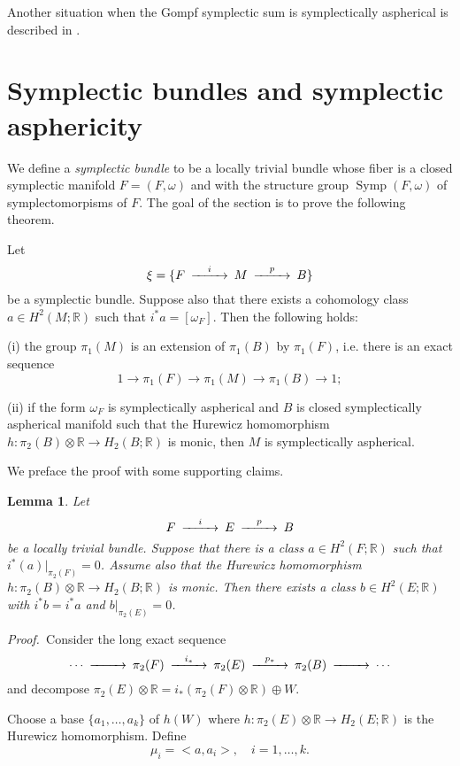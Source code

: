 \documentclass[12pt, twoside]{amsart}
\theoremstyle{plain}
\newtheorem{lemma}[theorem]{Lemma}
\theoremstyle{definition}
\numberwithin{equation}{section}
\def\RR{\mathbb R}
\def\sympl{\operatorname {Symp}}
\def\RR{\mathbb R}
\def\m{\medskip}
\def\p{{\it Proof.\ }}
\begin{document}
\m Another situation when the Gompf symplectic sum 
is symplectically aspherical is described in \cite[Proposition 3.1]{K}.

\section{Symplectic bundles and symplectic asphericity}\label{sec-bun}

We define a {\it symplectic bundle} to be a locally trivial bundle whose fiber 
is a closed symplectic manifold $F=(F,\omega)$ and with the structure group 
$\sympl(F,\omega)$ of symplectomorpisms of $F$. 
The goal of the section is to prove the following theorem.

\begin{theorem}\label{main-bundle}
Let
%
$$
\CD 
\xi=\{F @>{i}>> M @>{p}>> B\}
\endCD
$$
be a symplectic bundle. Suppose also that there exists a 
cohomology class $a\in H^2(M;\RR)$ such that $i^*a=[\omega_F]$. Then the 
following 
holds:

{\rm (i)} the group $\pi_1(M)$ is an
extension of $\pi_1(B)$ by $\pi_1(F)$, i.e. there is an exact sequence
$$
1\longrightarrow \pi_1(F)\longrightarrow \pi_1(M)\longrightarrow
\pi_1(B)\longrightarrow 1;
$$

\par {\rm (ii)}  if the form $\omega_F$ is symplectically aspherical and $B$ 
is 
closed symplectically aspherical manifold such that the Hurewicz homomorphism 
$h:\pi_2(B)\otimes \RR \to H_2(B;\RR)$ is monic, then $M$ is symplectically 
aspherical.
\end{theorem}


\m We preface the proof with some supporting claims.


\begin{lemma}\label{aspher-bundle}
Let
$$
\CD 
F @>{i}>> E @>{p}>> B
\endCD
$$
be a locally trivial bundle. Suppose that there is a class $a\in H^2(F;\RR)$ 
such that $i^*(a)|_{\pi_2(F)}=0$. Assume also that the Hurewicz homomorphism 
$h:\pi_2(B)\otimes \RR \to H_2(B;\RR)$ is monic. 
Then there exists a class $b\in H^2(E;\RR)$ with $i^*b=i^*a$ and 
$b|_{\pi_2(E)}=0$.
\end{lemma}

\p Consider the long exact sequence
$$
\CD
\cdots @>>> \pi_2(F) @>{i_*}>> \pi_2(E) @>{p_*}>>\pi_2(B) @>>> \cdots
\endCD
$$
and decompose $\pi_2(E)\otimes \RR=i_*(\pi_2(F)\otimes \RR)\oplus W$.

Choose a base $\{a_1,\ldots,a_k\}$ of $h(W)$ where $h: \pi_2(E)\otimes \RR \to 
H_2(E;\RR)$ 
is the Hurewicz homomorphism. Define 
$$
\mu_i=<a,a_i>,\quad i=1,\ldots ,k.
$$
\end{document}
